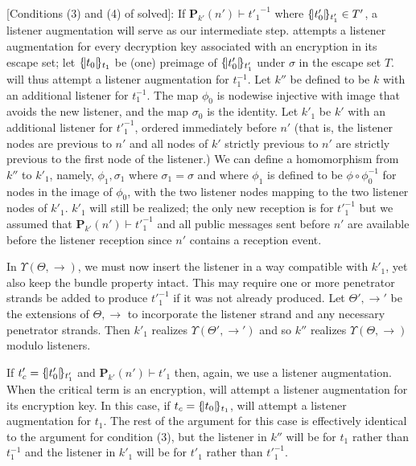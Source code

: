 \documentclass[12pt]{article}
\theoremstyle{definition}
\newcommand{\pubmsg}{\mathbf{P}}
\begin{document}
[Conditions (3) and (4) of solved]: If $\pubmsg_{k'}(n') \vdash {t'_1}^{-1}$ where $\{\!|t'_0|\!\}_{t'_1} \in T'$, a listener
augmentation will serve as our intermediate step.  {\cpsa} attempts a listener augmentation for every decryption
key associated with an encryption in its escape set; let $\{\!|t_0|\!\}_{t_1}$ be (one) preimage of $\{\!|t'_0|\!\}_{t'_1}$
under $\sigma$ in the escape set $T$.  {\cpsa} will thus attempt a listener augmentation for $t_1^{-1}$.  Let $k''$ be defined to be
$k$ with an additional listener for $t_1^{-1}$.  The map $\phi_0$ is nodewise injective with image that avoids the
new listener, and the map $\sigma_0$ is the identity.  Let $k'_1$ be $k'$ with an additional listener for ${t'}_1^{-1}$,
ordered immediately before $n'$ (that is, the listener nodes are previous to $n'$ and all nodes of $k'$ strictly
previous to $n'$ are strictly previous to the first node of the listener.)  We can define a homomorphism from $k''$
to $k'_1$, namely, $\phi_1,\sigma_1$ where $\sigma_1 = \sigma$ and where $\phi_1$ is defined to be $\phi \circ \phi_0^{-1}$
for nodes in the image of $\phi_0$, with the two listener nodes mapping to the two listener nodes of $k'_1$.
$k'_1$ will still be realized; the only new reception is for ${t'}_1^{-1}$ but we assumed that $\pubmsg_{k'}(n')
\vdash {t'}_1^{-1}$ and all public messages sent before $n'$ are available before the listener reception since $n'$
contains a reception event.

In $\Upsilon(\Theta,\to)$, we must now insert the listener in a way compatible with $k'_1$, yet also keep
the bundle property intact.  This may require one or more penetrator strands be added to produce ${t'}_1^{-1}$ if it
was not already produced.  Let $\Theta',\to'$ be the extensions of $\Theta,\to$ to incorporate the listener
strand and any necessary penetrator strands.  Then $k'_1$ realizes $\Upsilon(\Theta',\to')$ and so $k''$ realizes
$\Upsilon(\Theta,\to)$ modulo listeners.

If $t'_c = \{\!|t'_0|\!\}_{t'_1}$ and $\pubmsg_{k'}(n') \vdash t'_1$ then, again, we use a listener augmentation.  When
the critical term is an encryption, {\cpsa} will attempt a listener augmentation for its encryption key.  In this case,
if $t_c = \{\!|t_0|\!\}_{t_1}$, {\cpsa} will attempt a listener augmentation for $t_1$.  The rest of the argument for this case
is effectively identical to the argument for condition (3), but the listener in $k''$ will be for $t_1$ rather than $t_1^{-1}$
and the listener in $k'_1$ will be for $t'_1$ rather than ${t'}_1^{-1}$.
\end{document}
